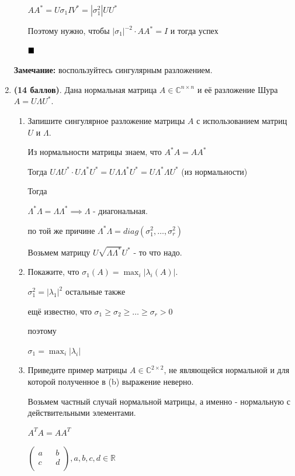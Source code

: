 \documentclass[a4paper, 11pt]{article}
\newcommand{\RR}{\mathbb{R}}
\newcommand{\prob}[1]{\item \textbf{(#1 баллов)}.}
\begin{document}
\begin{enumerate}
\begin{enumerate}
				$AA^* = U \sigma_1 I V^* = |\sigma_1^2| U U^*$
				
				Поэтому нужно, чтобы $|\sigma_1|^{-2} \cdot AA^* = I$ и тогда успех
								
				$\hfill \blacksquare$
			
		\end{enumerate}
		\textbf{Замечание:} воспользуйтесь сингулярным разложением.
		\prob{14} Дана нормальная матрица $A\in\mathbb{C}^{n\times n}$ и её разложение Шура $A = U\Lambda U^*$.
		\begin{enumerate}
			\item Запишите сингулярное разложение матрицы $A$ с использованием матриц $U$ и $\Lambda$.
				
				Из нормальности матрицы знаем, что $A^* A = A A^*$
				
				Тогда $U\Lambda U^* \cdot U\Lambda^* U^* = U\Lambda  \Lambda^* U^* = U \Lambda^* \Lambda U^*$ (из нормальности)
				
				Тогда 
				
				$\Lambda^* \Lambda = \Lambda \Lambda^* \implies \Lambda$ - диагональная.
				
				по той же причине $\Lambda^* \Lambda = diag(\sigma_1^2, \dots, \sigma_r^2)$
				
				Возьмем матрицу $U \sqrt{\Lambda \Lambda^*} U^*$ - то что надо.
				
				
			
			\item Покажите, что $\sigma_1(A) = \max_i |\lambda_i(A)|$.
			
				$\sigma_1^2 = |\lambda_1|^2$ остальные также
				
				ещё известно, что $\sigma_1 \geqslant \sigma_2 \geqslant \dots \geqslant \sigma_r > 0$
				
				поэтому 
				
				$\sigma_1 = \max_i |\lambda_i|$
				
			
			\item Приведите пример  матрицы $A \in \mathbb{C}^{2\times 2}$, не являющейся нормальной и для которой полученное в (b) выражение неверно. 
			
				Возьмем частный случай нормальной матрицы, а именно - нормальную с действительными элементами. 
				
				$A^T A = A A^T$
				
				$\begin{pmatrix}
					a && b \\
					c && d \\
				\end{pmatrix}, a, b, c, d \in \RR$
			

\end{enumerate}
\end{enumerate}
\end{document}
